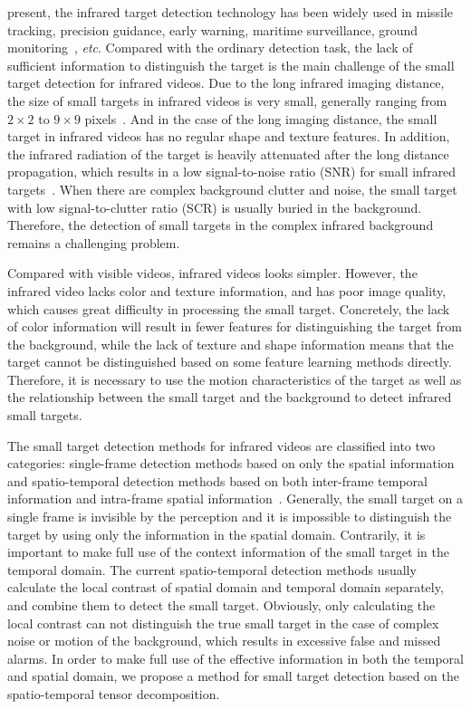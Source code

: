 \documentclass[journal]{IEEEtran}
\begin{document}
 present, the infrared target detection technology has been widely used in missile tracking, precision guidance, early warning, maritime surveillance, ground monitoring~\cite{luo2015space,dawson2010space,li2014infrared}, \emph{etc}. Compared with the ordinary detection task, the lack of sufficient information to distinguish the target is the main challenge of the small target detection for infrared videos. Due to the long infrared imaging distance, the size of small targets in infrared videos is very small, generally ranging from $2\times2$ to $9\times9$ pixels~\cite{wang2017infrared}. And in the case of the long imaging distance, the small target in infrared videos has no regular shape and texture features. In addition, the infrared radiation of the target is heavily attenuated after the long distance propagation, which results in a low signal-to-noise ratio (SNR) for small infrared targets~\cite{li2016novel}. When there are complex background clutter and noise, the small target with low signal-to-clutter ratio (SCR) is usually buried in the background. Therefore, the detection of small targets in the complex infrared background remains a challenging problem.

Compared with visible videos, infrared videos looks simpler. However, the infrared video lacks color and texture information, and has poor image quality, which causes great difficulty in processing the small target. Concretely, the lack of color information will result in fewer features for distinguishing the target from the background, while the lack of texture and shape information means that the target cannot be distinguished based on some feature learning methods directly. Therefore, it is necessary to use the motion characteristics of the target as well as the relationship between the small target and the background to detect infrared small targets.

The small target detection methods for infrared videos are classified into two categories: single-frame detection methods based on only the spatial information and spatio-temporal detection methods based on both inter-frame temporal information and intra-frame spatial information~\cite{li2016novel}. Generally, the small target on a single frame is invisible by the perception and it is impossible to distinguish the target by using only the information in the spatial domain. Contrarily, it is important to make full use of the context information of the small target in the temporal domain. The current spatio-temporal detection methods usually calculate the local contrast of spatial domain and temporal domain separately, and combine them to detect the small target. Obviously, only calculating the local contrast can not distinguish the true small target in the case of complex noise or motion of the background, which results in excessive false and missed alarms. In order to make full use of the effective information in both the temporal and spatial domain, we propose a method for small target detection based on the spatio-temporal tensor decomposition.
\end{document}
